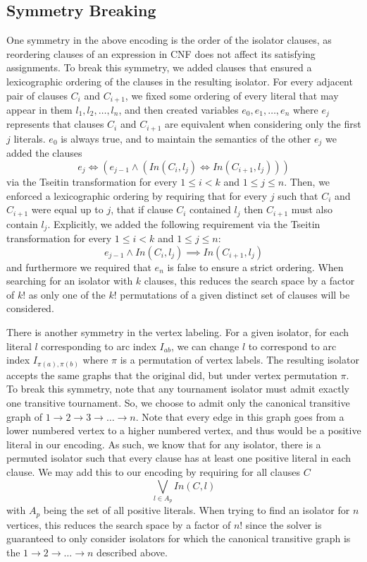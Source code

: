 \documentclass[conference]{IEEEtran}
\begin{document}
\subsection{Symmetry Breaking}

One symmetry in the above encoding is the order of the isolator clauses, as reordering clauses of an expression in CNF does not affect its satisfying assignments.  To break this symmetry, we added clauses that ensured a lexicographic ordering of the clauses in the resulting isolator.  For every adjacent pair of clauses $C_i$ and $C_{i+1}$, we fixed some ordering of every literal that may appear in them $l_1, l_2, \dots, l_n$, and then created variables $e_0, e_1, \dots, e_n$ where $e_j$ represents that clauses $C_i$ and $C_{i+1}$ are equivalent when considering only the first $j$ literals.  $e_0$ is always true, and to maintain the semantics of the other $e_j$ we added the clauses
$$e_j \Leftrightarrow (e_{j-1} \land (In(C_i, l_j) \Leftrightarrow In(C_{i+1}, l_j)))$$
via the Tseitin transformation for every $1 \le i < k$ and $1 \le j\le n$.  Then, we enforced a lexicographic ordering by requiring that for every $j$ such that $C_i$ and $C_{i+1}$ were equal up to $j$, that if clause $C_i$ contained $l_j$ then $C_{i+1}$ must also contain $l_j$.  Explicitly, we added the following requirement via the Tseitin transformation for every $1 \le i < k$ and $1 \le j\le n$:
$$e_{j-1} \land In(C_i, l_j) \implies In(C_{i+1}, l_j)$$
and furthermore we required that $e_n$ is false to ensure a strict ordering.  When searching for an isolator with $k$ clauses, this reduces the search space by a factor of $k!$ as only one of the $k!$ permutations of a given distinct set of clauses will be considered.

There is another symmetry in the vertex labeling.  For a given isolator, for each literal $l$ corresponding to arc index $I_{ab}$, we can change $l$ to correspond to arc index $I_{\pi(a),\pi(b)}$ where $\pi$ is a permutation of vertex labels. The resulting isolator accepts the same graphs that the original did, but under vertex permutation $\pi$.  To break this symmetry, note that any tournament isolator must admit exactly one transitive tournament.  So, we choose to admit only the canonical transitive graph of $1 \to 2 \to 3 \to \dots \to n$.  Note that every edge in this graph goes from a lower numbered vertex to a higher numbered vertex, and thus would be a positive literal in our encoding.  As such, we know that for any isolator, there is a permuted isolator such that every clause has at least one positive literal in each clause.  We may add this to our encoding by requiring for all clauses $C$
$$\bigvee_{l \in A_p} In(C, l)$$
with $A_p$ being the set of all positive literals.    When trying to find an isolator for $n$ vertices, this reduces the search space by a factor of $n!$ since the solver is guaranteed to only consider isolators for which the canonical transitive graph is the $1 \to 2 \to \dots \to n$ described above.
\end{document}
